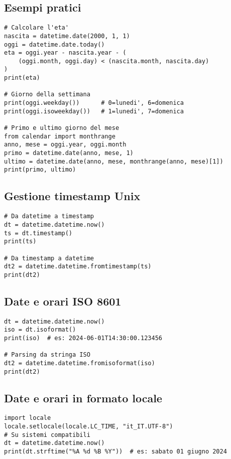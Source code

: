 \documentclass[a4paper,12pt]{article}
\begin{document}
\subsection*{Esempi pratici}
\begin{lstlisting}
# Calcolare l'eta'
nascita = datetime.date(2000, 1, 1)
oggi = datetime.date.today()
eta = oggi.year - nascita.year - (
    (oggi.month, oggi.day) < (nascita.month, nascita.day)
)
print(eta)

# Giorno della settimana
print(oggi.weekday())      # 0=lunedi', 6=domenica
print(oggi.isoweekday())   # 1=lunedi', 7=domenica

# Primo e ultimo giorno del mese
from calendar import monthrange
anno, mese = oggi.year, oggi.month
primo = datetime.date(anno, mese, 1)
ultimo = datetime.date(anno, mese, monthrange(anno, mese)[1])
print(primo, ultimo)
\end{lstlisting}

\subsection*{Gestione timestamp Unix}
\begin{lstlisting}
# Da datetime a timestamp
dt = datetime.datetime.now()
ts = dt.timestamp()
print(ts)

# Da timestamp a datetime
dt2 = datetime.datetime.fromtimestamp(ts)
print(dt2)
\end{lstlisting}

\subsection*{Date e orari ISO 8601}
\begin{lstlisting}
dt = datetime.datetime.now()
iso = dt.isoformat()
print(iso)  # es: 2024-06-01T14:30:00.123456

# Parsing da stringa ISO
dt2 = datetime.datetime.fromisoformat(iso)
print(dt2)
\end{lstlisting}

\subsection*{Date e orari in formato locale}
\begin{lstlisting}
import locale
locale.setlocale(locale.LC_TIME, "it_IT.UTF-8")
# Su sistemi compatibili
dt = datetime.datetime.now()
print(dt.strftime("%A %d %B %Y"))  # es: sabato 01 giugno 2024
\end{lstlisting}
\end{document}
